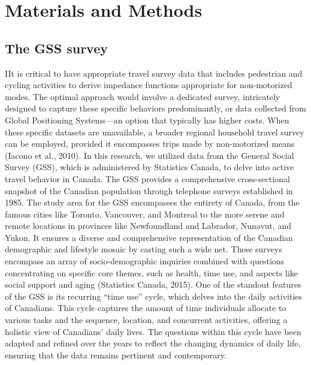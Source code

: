 \documentclass[
11pt, %
oneside, %
english, %
singlespacing, %
]{macthesis} %
\begin{document}
\section{Materials and Methods}\label{materials-and-methods}

\subsection{The GSS survey}\label{the-gss-survey}

IIt is critical to have appropriate travel survey data that includes pedestrian and cycling activities to derive impedance functions appropriate for non-motorized modes. The optimal approach would involve a dedicated survey, intricately designed to capture these specific behaviors predominantly, or data collected from Global Positioning Systems---an option that typically has higher costs. When these specific datasets are unavailable, a broader regional household travel survey can be employed, provided it encompasses trips made by non-motorized means (Iacono et al., 2010). In this research, we utilized data from the General Social Survey (GSS), which is administered by Statistics Canada, to delve into active travel behavior in Canada. The GSS provides a comprehensive cross-sectional snapshot of the Canadian population through telephone surveys established in 1985. The study area for the GSS encompasses the entirety of Canada, from the famous cities like Toronto, Vancouver, and Montreal to the more serene and remote locations in provinces like Newfoundland and Labrador, Nunavut, and Yukon. It ensures a diverse and comprehensive representation of the Canadian demographic and lifestyle mosaic by casting such a wide net. These surveys encompass an array of socio-demographic inquiries combined with questions concentrating on specific core themes, such as health, time use, and aspects like social support and aging (Statistics Canada, 2015). One of the standout features of the GSS is its recurring ``time use'' cycle, which delves into the daily activities of Canadians. This cycle captures the amount of time individuals allocate to various tasks and the sequence, location, and concurrent activities, offering a holistic view of Canadians' daily lives. The questions within this cycle have been adapted and refined over the years to reflect the changing dynamics of daily life, ensuring that the data remains pertinent and contemporary.
\end{document}
